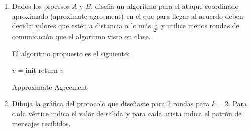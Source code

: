 \documentclass[12pt,a4paper]{report}
\begin{document}
\begin{enumerate}
	\item {
		Dados los procesos $A$ y $B$, diseña un algoritmo para el ataque coordinado
		aproximado (aproximate agreement) en el que para llegar al acuerdo deben
		decidir	valores que estén a distancia a lo más $\frac{1}{2^k}$ y utilice 
		menos rondas de comunicación que el algoritmo visto en clase.
		
		El algoritmo propuesto es el siguiente:\\
		
		\IncMargin{1em}
		\begin{algorithm}
			\BlankLine
			$v$ = init \;
			return $v$\;
			\caption{Approximate Agreement}
		\end{algorithm}\DecMargin{1em}

	}

	\item {
		Dibuja la gráfica del protocolo que diseñaste para 2 rondas para $k = 2$.
		Para cada vértice indica el valor de salida y para cada arista indica el
		patrón de mensajes recibidos.
	}


\end{enumerate}
\end{document}
